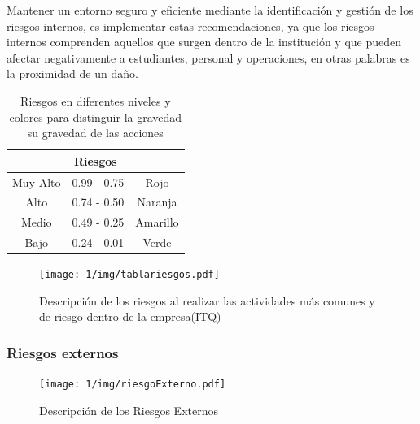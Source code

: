     Mantener un entorno seguro y eficiente mediante la identificación y gestión de los riesgos internos, es implementar estas recomendaciones, ya que los riesgos internos comprenden aquellos que surgen dentro de la institución y que pueden afectar negativamente a estudiantes, personal y operaciones, en otras palabras es la proximidad de un daño.
    \begin{table}[h]
        \centering
        \caption{Riesgos en diferentes niveles y colores para distinguir la gravedad su gravedad de las acciones}
        \begin{tabular}{c c c}
        \hline
        \multicolumn{3}{c}{Riesgos}\\
        \hline
              Muy Alto& 0.99 - 0.75 & Rojo  \\
        \hline
              Alto& 0.74 - 0.50 & Naranja  \\
        \hline
             Medio& 0.49 - 0.25 & Amarillo  \\
        \hline
             Bajo& 0.24 - 0.01 & Verde \\
        \hline     
        \end{tabular}
        \label{tab:riesgos}
    \end{table}
    \begin{figure}[H]
        \centering
        \texttt{[image: 1/img/tablariesgos.pdf]}
        \caption{Descripción de los riesgos al realizar las actividades más comunes y de riesgo dentro de la empresa(ITQ)}
    \end{figure}
    \subsubsection{Riesgos externos}
    \begin{figure}[H]
        \centering
        \texttt{[image: 1/img/riesgoExterno.pdf]}
        \caption{Descripción de los Riesgos Externos}
    \end{figure}
